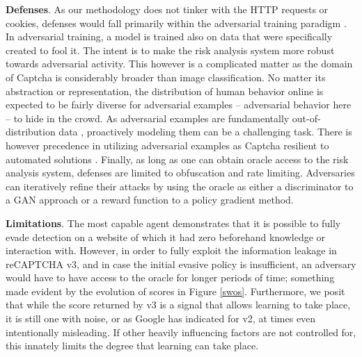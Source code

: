 \textbf{Defenses}. As our methodology does not tinker with the HTTP requests or cookies, defenses would fall primarily within the adversarial training paradigm \cite{tramer2017ensemble}.
In adversarial training, a model is trained also on data that were specifically created to fool it.
The intent is to make the risk analysis system more robust towards adversarial activity.
This however is a complicated matter as the domain of Captcha is considerably broader than image classification.
No matter its abstraction or representation, the distribution of human behavior online is expected to be fairly diverse for adversarial examples -- adversarial behavior here -- to hide in the crowd.
As adversarial examples are fundamentally out-of-distribution data \cite{geirhos2020shortcut}, proactively modeling them can be a challenging task.
There is however precedence in utilizing adversarial examples as Captcha resilient to automated solutions \cite{osadchy2017no}.
Finally, as long as one can obtain oracle access to the risk analysis system, defenses are limited to obfuscation and rate limiting.
Adversaries can iteratively refine their attacks by using the oracle as either a discriminator to a \gls{GAN} approach or a reward function to a policy gradient method.

\textbf{Limitations}. The most capable agent demonstrates that it is possible to fully evade detection on a website of which it had zero beforehand knowledge or interaction with.
However, in order to fully exploit the information leakage in reCAPTCHA v3, and in case the initial evasive policy is insufficient, an adversary would have to have access to the oracle for longer periods of time; something made evident by the evolution of scores in Figure \ref{swos}.
Furthermore, we posit that while the score returned by v3 is a signal that allows learning to take place, it is still one with noise, or as Google has indicated for v2, at times even intentionally misleading.
If other heavily influencing factors are not controlled for, this innately limits the degree that learning can take place.

